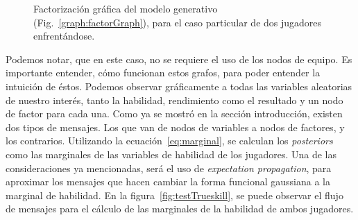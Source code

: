 \documentclass[11pt,twoside,spanish]{report} %
\begin{document}
\begin{figure}[H]
	\centering
\caption{ Factorizaci\'on gráfica del modelo generativo (Fig.~\ref{graph:factorGraph}), para el caso particular de dos jugadores enfrent\'andose.}
\label{fig:ejfig1vs1}
\end{figure}


Podemos notar, que en este caso, no se requiere el uso de los nodos de equipo.
Es importante entender, c\'omo funcionan estos grafos, para poder entender la intuici\'on de \'estos.
Podemos observar gr\'aficamente a todas las variables aleatorias de nuestro inter\'es, tanto la habilidad, rendimiento como el resultado y un nodo de factor para cada una.
Como ya se mostr\'o en la secci\'on introducci\'on, existen dos tipos de mensajes.
Los que van de nodos de variables a nodos de factores, y los contrarios.
Utilizando la ecuaci\'on~\ref{eq:marginal}, se calculan los \textit{posteriors} como las marginales de las variables de habilidad de los jugadores. 
Una de las consideraciones ya mencionadas, ser\'a el uso de \textit{expectation propagation}, para aproximar los mensajes que hacen cambiar la forma funcional gaussiana a la marginal de habilidad.
En la figura~\ref{fig:testTrueskill}, se puede observar el flujo de mensajes para el c\'alculo de las marginales de la habilidad de ambos jugadores. 
\end{document}
